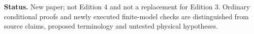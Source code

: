 \documentclass[11pt,a4paper]{article}
\numberwithin{equation}{section}
\theoremstyle{definition}
\theoremstyle{remark}
\begin{document}
\vspace{3pt}
\noindent\textbf{Status.} New paper; not Edition 4 and not a replacement for Edition 3. Ordinary conditional proofs and newly executed finite-model checks are distinguished from source claims, proposed terminology and untested physical hypotheses.
\newpage
\tableofcontents
\newpage






\end{document}
